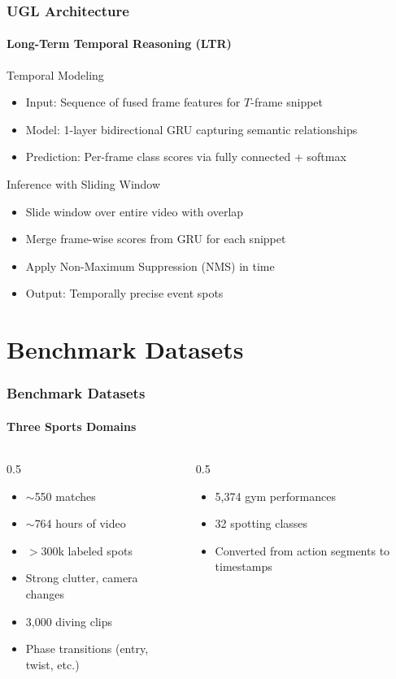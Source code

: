 \documentclass[aspectratio=169, lecture, amberg]{OTHAWbeamer}
\begin{document}
\begin{frame}
\frametitle{UGL Architecture}
\framesubtitle{Long-Term Temporal Reasoning (LTR)}
\begin{block}{Temporal Modeling}
\begin{itemize}
\item Input: Sequence of fused frame features for $T$-frame snippet
\item Model: 1-layer bidirectional GRU capturing semantic relationships
\item Prediction: Per-frame class scores via fully connected + softmax
\end{itemize}
\end{block}

\begin{block}{Inference with Sliding Window}
\begin{itemize}
\item Slide window over entire video with overlap
\item Merge frame-wise scores from GRU for each snippet
\item Apply Non-Maximum Suppression (NMS) in time
\item Output: Temporally precise event spots
\end{itemize}
\end{block}
\end{frame}


\section{Benchmark Datasets}

\begin{frame}
\frametitle{Benchmark Datasets}
\framesubtitle{Three Sports Domains}
\begin{columns}
\begin{column}{0.5\textwidth}
\begin{itemize}
\item $\sim$550 matches
\item $\sim$764 hours of video
\item $>$300k labeled spots
\item Strong clutter, camera changes
\end{itemize}

\begin{itemize}
\item 3,000 diving clips
\item Phase transitions (entry, twist, etc.)
\end{itemize}
\end{column}
\begin{column}{0.5\textwidth}
\begin{itemize}
\item 5,374 gym performances
\item 32 spotting classes
\item Converted from action segments to timestamps
\end{itemize}
\end{column}
\end{columns}
\end{frame}
\end{document}
